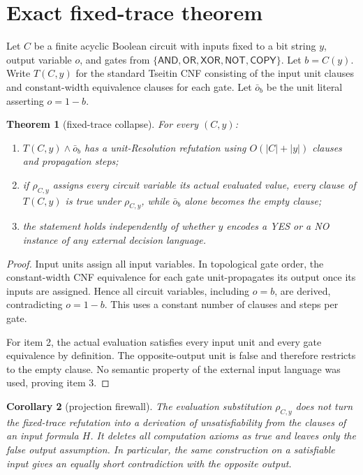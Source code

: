 \documentclass[11pt]{article}
\newtheorem{theorem}{Theorem}
\newtheorem{corollary}[theorem]{Corollary}
\begin{document}
\section{Exact fixed-trace theorem}
Let \(C\) be a finite acyclic Boolean circuit with inputs fixed to a bit string
\(y\), output variable \(o\), and gates from
\(\{\mathsf{AND},\mathsf{OR},\mathsf{XOR},\mathsf{NOT},\mathsf{COPY}\}\).
Let \(b=C(y)\).  Write \(T(C,y)\) for the standard Tseitin CNF consisting of
the input unit clauses and constant-width equivalence clauses for each gate.
Let \(\bar o_b\) be the unit literal asserting \(o=1-b\).

\begin{theorem}[fixed-trace collapse]
For every \((C,y)\):
\begin{enumerate}
\item \(T(C,y)\wedge \bar o_b\) has a unit-Resolution refutation using
  \(O(|C|+|y|)\) clauses and propagation steps;
\item if \(\rho_{C,y}\) assigns every circuit variable its actual evaluated
  value, every clause of \(T(C,y)\) is true under \(\rho_{C,y}\), while
  \(\bar o_b\) alone becomes the empty clause;
\item the statement holds independently of whether \(y\) encodes a YES or a
  NO instance of any external decision language.
\end{enumerate}
\end{theorem}

\begin{proof}
Input units assign all input variables.  In topological gate order, the
constant-width CNF equivalence for each gate unit-propagates its output once
its inputs are assigned.  Hence all circuit variables, including \(o=b\),
are derived, contradicting \(o=1-b\).  This uses a constant number of clauses
and steps per gate.

For item 2, the actual evaluation satisfies every input unit and every gate
equivalence by definition.  The opposite-output unit is false and therefore
restricts to the empty clause.  No semantic property of the external input
language was used, proving item 3.
\end{proof}

\begin{corollary}[projection firewall]
The evaluation substitution \(\rho_{C,y}\) does not turn the fixed-trace
refutation into a derivation of unsatisfiability from the clauses of an input
formula \(H\).  It deletes all computation axioms as true and leaves only the
false output assumption.  In particular, the same construction on a
satisfiable input gives an equally short contradiction with the opposite
output.
\end{corollary}
\end{document}
